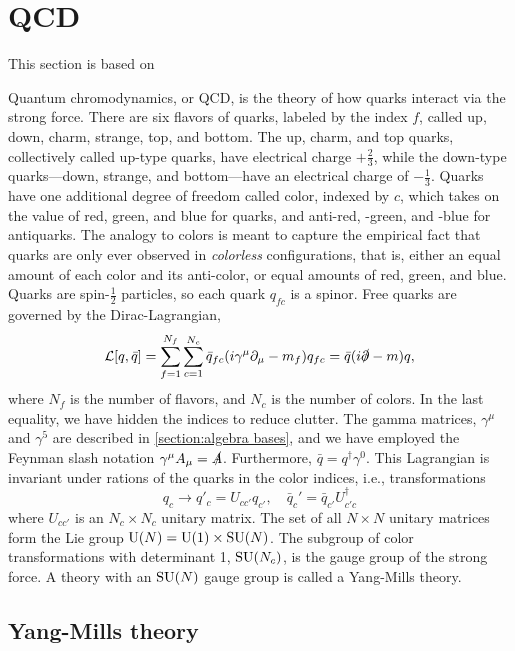 \section{QCD}
\label{section:QCD}
This section is based on~\cite{Schwartz:QFT,Peskin:IntroQFT,Scherer2002IntroductionTC}

Quantum chromodynamics, or QCD, is the theory of how quarks interact via the strong force.
There are six flavors of quarks, labeled by the index $f$, called up, down, charm, strange, top, and bottom.
The up, charm, and top quarks, collectively called up-type quarks, have electrical charge $+\frac{2}{3}$, while the down-type quarks---down, strange, and bottom---have an electrical charge of $-\frac{1}{3}$.
Quarks have one additional degree of freedom called color, indexed by $c$, which takes on the value of red, green, and blue for quarks, and anti-red, -green, and -blue for antiquarks.
The analogy to colors is meant to capture the empirical fact that quarks are only ever observed in \emph{colorless} configurations, that is, either an equal amount of each color and its anti-color, or equal amounts of red, green, and blue.
Quarks are spin-$\frac{1}{2}$ particles, so each quark $q_{fc}$ is a spinor.
Free quarks are governed by the Dirac-Lagrangian,
\begin{equation}
    \mathcal{L}[q, \bar q] = \sum_{f=1}^{N_f} \sum_{c = 1}^{N_c} \bar q_{fc} (i\gamma^\mu \partial_\mu - m_f )q_{fc}
    = \bar q (i\slashed{\partial } - m)q,
\end{equation}
%
where $N_f$ is the number of flavors, and $N_c$ is the number of colors.
In the last equality, we have hidden the indices to reduce clutter.
The gamma matrices, $\gamma^\mu$ and $\gamma^5$ are described in \autoref{section:algebra bases}, and we have employed the Feynman slash notation $\gamma^\mu A_\mu = \slashed A$.
Furthermore, $\bar q = q^\dagger \gamma^0$.
This Lagrangian is invariant under rations of the quarks in the color indices, i.e., transformations
\begin{equation}
    q_c \rightarrow q'_c = U_{cc'} q_{c'},
    \quad 
    \bar q_c' = \bar q_{c'} U_{c'c}^\dagger 
\end{equation}
%
where $U_{cc'}$ is an $N_c \times N_c$ unitary matrix.
The set of all $N\times N$ unitary matrices form the Lie group $\mathrm{U}(N) = \mathrm{U}(1)\times \mathrm{SU}(N)$.
The subgroup of color transformations with determinant 1, $\mathrm{SU}(N_c)$, is the gauge group of the strong force.
A theory with an $\mathrm{SU}(N)$ gauge group is called a Yang-Mills theory.

\subsection*{Yang-Mills theory}

